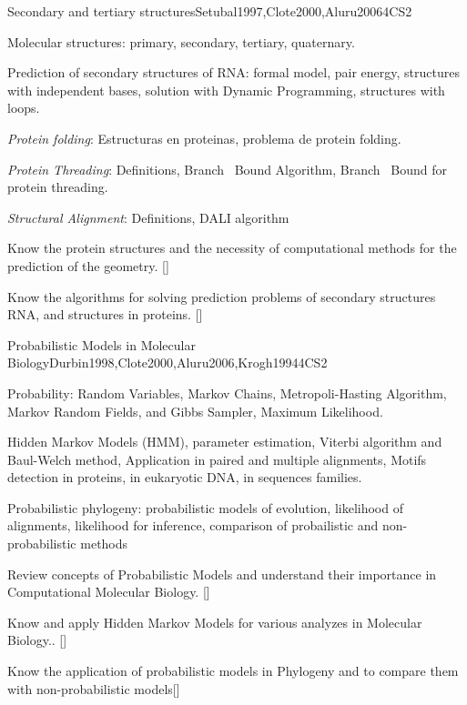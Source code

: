 \begin{syllabus}
\begin{unit}{Secondary and tertiary structures}{}{Setubal1997,Clote2000,Aluru2006}{4}{CS2}
   \begin{topics}
    \item Molecular structures: primary, secondary, tertiary, quaternary.
    \item Prediction of secondary structures of RNA: formal model, pair energy, structures with independent bases, solution with Dynamic Programming, structures with loops.
    \item \textit{Protein folding}: Estructuras en proteinas, problema de protein folding.
    \item \textit{Protein Threading}: Definitions, Branch \ Bound Algorithm, Branch \ Bound for protein threading.
    \item \textit{Structural Alignment}: Definitions, DALI algorithm
   \end{topics}
   \begin{learningoutcomes}
     \item Know the protein structures and the necessity of computational methods for the prediction of the geometry. [\Familiarity]
	   \item Know the algorithms for solving prediction problems of secondary structures RNA, and structures in proteins. [\Assessment]
   \end{learningoutcomes}
\end{unit}

\begin{unit}{Probabilistic Models in Molecular Biology}{}{Durbin1998,Clote2000,Aluru2006,Krogh1994}{4}{CS2}
   \begin{topics}
    \item Probability: Random Variables, Markov Chains, Metropoli-Hasting Algorithm, Markov Random Fields, and Gibbs Sampler, Maximum Likelihood.
    \item Hidden Markov Models (HMM),  parameter estimation, Viterbi algorithm and Baul-Welch method, Application in paired and multiple alignments, Motifs detection in proteins, in eukaryotic DNA, in sequences families.
		\item Probabilistic phylogeny: probabilistic models of evolution, likelihood of alignments, likelihood for inference, comparison of probailistic and non-probabilistic methods
   \end{topics}
   \begin{learningoutcomes}
      \item  Review concepts of Probabilistic Models and understand their importance in Computational Molecular Biology. [\Assessment]
	  \item Know and apply Hidden Markov Models for various analyzes in Molecular Biology.. [\Usage]
		\item Know the application of probabilistic models in Phylogeny and to compare them with non-probabilistic models[\Assessment]
   \end{learningoutcomes}
\end{unit}

\begin{coursebibliography}
\end{coursebibliography}

\end{syllabus}
